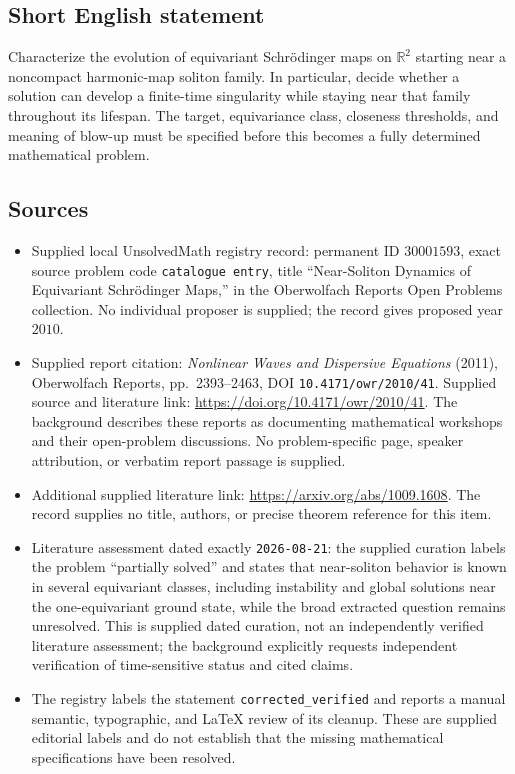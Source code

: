 \documentclass[11pt]{article}
\newcommand{\R}{\mathbb{R}}
\begin{document}
\subsection{Short English statement}
Characterize the evolution of equivariant Schr\"odinger maps on $\R^2$ starting near a noncompact harmonic-map soliton family. In particular, decide whether a solution can develop a finite-time singularity while staying near that family throughout its lifespan. The target, equivariance class, closeness thresholds, and meaning of blow-up must be specified before this becomes a fully determined mathematical problem.
\subsection{Sources}
\begin{itemize}
\item Supplied local UnsolvedMath registry record: permanent ID $30001593$, exact source problem code \texttt{catalogue entry}, title ``Near-Soliton Dynamics of Equivariant Schr\"odinger Maps,'' in the Oberwolfach Reports Open Problems collection. No individual proposer is supplied; the record gives proposed year $2010$.
\item Supplied report citation: \emph{Nonlinear Waves and Dispersive Equations} (2011), Oberwolfach Reports, pp.~2393--2463, DOI \texttt{10.4171/owr/2010/41}. Supplied source and literature link: \url{https://doi.org/10.4171/owr/2010/41}. The background describes these reports as documenting mathematical workshops and their open-problem discussions. No problem-specific page, speaker attribution, or verbatim report passage is supplied.
\item Additional supplied literature link: \url{https://arxiv.org/abs/1009.1608}. The record supplies no title, authors, or precise theorem reference for this item.
\item Literature assessment dated exactly \texttt{2026-08-21}: the supplied curation labels the problem ``partially solved'' and states that near-soliton behavior is known in several equivariant classes, including instability and global solutions near the one-equivariant ground state, while the broad extracted question remains unresolved. This is supplied dated curation, not an independently verified literature assessment; the background explicitly requests independent verification of time-sensitive status and cited claims.
\item The registry labels the statement \texttt{corrected\_verified} and reports a manual semantic, typographic, and LaTeX review of its cleanup. These are supplied editorial labels and do not establish that the missing mathematical specifications have been resolved.
\end{itemize}
\end{document}
